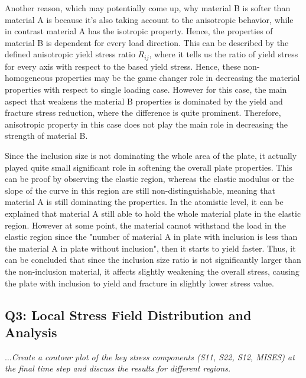 \documentclass[12pt]{article}
\begin{document}
\hspace{2em}Another reason, which may potentially come up, why material B is softer than material A is because it's also taking account to the anisotropic behavior, while
in contrast material A has the isotropic property. Hence, the properties of material B is dependent for every load direction. This can be described
by the defined anisotropic yield stress ratio $R_{ij}$, where it tells us the ratio of yield stress for every axis with respect to the based yield
stress. Hence, these non-homogeneous properties may be the game changer role in decreasing the material properties with respect to 
single loading case. However for this case, the main aspect that weakens the material B properties is dominated by the yield and fracture stress reduction,
where the difference is quite prominent. Therefore, anisotropic property in this case does not play the main role in decreasing the strength of material B. 

\hspace{2em}Since the inclusion size is not dominating the whole area of the plate, it actually played quite small significant role in softening
the overall plate properties. This can be proof by observing the elastic region, whereas the elastic modulus or the slope of the curve in this 
region are still non-distinguishable, meaning that material A is still dominating the properties. In the atomistic level, it can be 
explained that material A still able to hold the whole material plate in the elastic region. However at some point, the material cannot
withstand the load in the elastic region since the "number of material A in plate with inclusion is less than the material A in plate without inclusion", 
then it starts to yield faster. Thus, it can be concluded that since the inclusion size ratio is not significantly larger than the non-inclusion material,
it affects slightly weakening the overall stress, causing the plate with inclusion to yield and fracture in slightly lower stress value.   



\newpage
\subsection*{Q3: Local Stress Field Distribution and Analysis}
\textit{$\dots$Create a contour plot of the key stress components (S11, S22, S12, MISES) at the final time
step and discuss the results for different regions.}
\vspace{1em}
\end{document}
